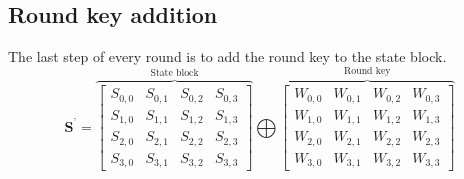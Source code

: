 \documentclass[report.tex]{subfiles}
\begin{document}
\subsection{Round key addition}
The last step of every round is to add the round key to the state block.
\begin{equation}
\label{eq:round key}
	\mathbf{S^\text{'}} = 
	\overbrace{
	\begin{bmatrix}
	S_{0,0} & S_{0,1} & S_{0,2} & S_{0,3} \\
	S_{1,0} & S_{1,1} & S_{1,2} & S_{1,3} \\
	S_{2,0} & S_{2,1} & S_{2,2} & S_{2,3} \\
	S_{3,0} & S_{3,1} & S_{3,2} & S_{3,3}
	\end{bmatrix}}^\text{State block}
	\bigoplus
	\overbrace{
	\begin{bmatrix}
	W_{0,0} & W_{0,1} & W_{0,2} & W_{0,3} \\
	W_{1,0} & W_{1,1} & W_{1,2} & W_{1,3} \\
	W_{2,0} & W_{2,1} & W_{2,2} & W_{2,3} \\
	W_{3,0} & W_{3,1} & W_{3,2} & W_{3,3}
	\end{bmatrix}}^\text{Round key}
\end{equation}
\end{document}
